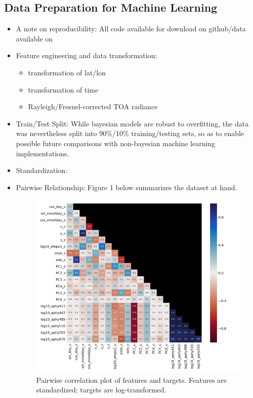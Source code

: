 \documentclass[10pt,a4paper]{article}
\begin{document}
		\subsection{Data Preparation for Machine Learning}
			\begin{itemize}
			    \item A note on reproducibility: All code available for download on github/data available on  
				\item Feature engineering and data transformation:
				\begin{itemize}
				    \item transformation of lat/lon
				    \item transformation of time
				    \item Rayleigh/Fresnel-corrected TOA radiance 
				\end{itemize}   
				\item Train/Test Split: While bayesian models are robust to overfitting, the data was nevertheless split into 90\%/10\% training/testing sets, so as to enable possible future comparisons with non-bayesian machine learning implementations. 
				\item Standardization: 
				\item Pairwise Relationship: Figure 1 below summarizes the dataset at hand.
				\begin{figure}[H]
				    \centering
				    \includegraphics[scale=0.5]{feature_heatmap_annotated.png}
				\caption{Pairwise correlation plot of features and targets. Features are standardized; targets are log-transformed.}
			\end{figure}
			\end{itemize}
\end{document}
